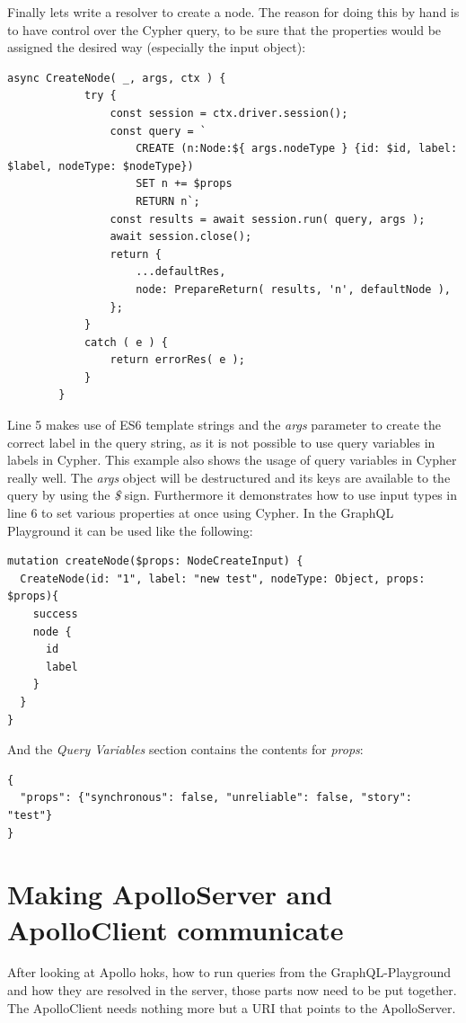 Finally lets write a resolver to create a node. The reason for doing this by hand is to have control over the Cypher query, to be sure that the properties would be assigned the desired way (especially the input object):
\lstset{language=JavaScript}
\begin{lstlisting}[caption={Using returned Values from the Query}]
		async CreateNode( _, args, ctx ) {
			try {
				const session = ctx.driver.session();
				const query = `
					CREATE (n:Node:${ args.nodeType } {id: $id, label: $label, nodeType: $nodeType})
					SET n += $props
					RETURN n`;
				const results = await session.run( query, args );
				await session.close();
				return {
					...defaultRes,
					node: PrepareReturn( results, 'n', defaultNode ),
				};
			}
			catch ( e ) {
				return errorRes( e );
			}
		}
\end{lstlisting}
Line 5 makes use of ES6 template strings and the \emph{args} parameter to create the correct label in the query string, as it is not possible to use query variables in labels in Cypher. This example also shows the usage of query variables in Cypher really well. The \emph{args} object will be destructured and its keys are available to the query by using the \emph{\$} sign. Furthermore it demonstrates how to use input types in line 6 to set various properties at once using Cypher. In the GraphQL Playground it can be used like the following:
\lstset{language=GraphQL}
\begin{lstlisting}[caption={Using the Create Node resolver},label={ex:RunCreateNode}]
mutation createNode($props: NodeCreateInput) {
  CreateNode(id: "1", label: "new test", nodeType: Object, props: $props){
    success
    node {
      id
      label
    }
  }
}
\end{lstlisting}

And the \emph{Query Variables} section contains the contents for \emph{props}:
\begin{lstlisting}[caption={Query Variables}]
{
  "props": {"synchronous": false, "unreliable": false, "story": "test"}
}
\end{lstlisting}

\section{Making ApolloServer and ApolloClient communicate}
After looking at Apollo hoks, how to run queries from the GraphQL-Playground and how they are resolved in the server, those parts now need to be put together. The ApolloClient needs nothing more but a URI that points to the ApolloServer.


